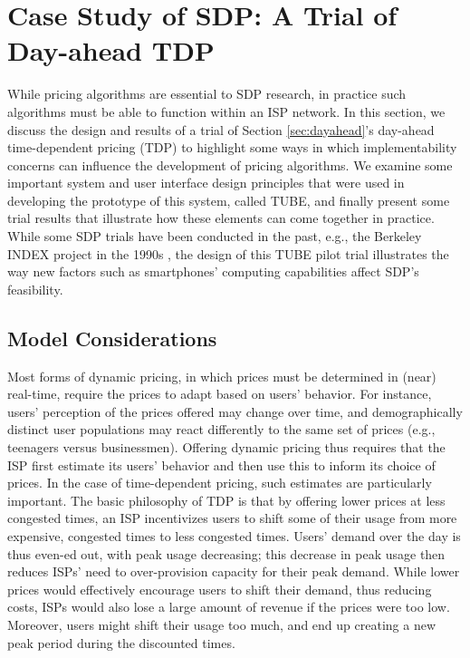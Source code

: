 \section{Case Study of SDP: A Trial of Day-ahead TDP}\label{sec:TDP}

While pricing algorithms are essential to SDP research, in practice such algorithms must be able to function within an ISP network. In this section, we discuss the design and results of a trial of Section \ref{sec:dayahead}'s day-ahead time-dependent pricing (TDP) to highlight some ways in which implementability concerns can influence the development of pricing algorithms. We examine some important system and user interface design principles that were used in developing the prototype of this system, called TUBE, and finally present some trial results that illustrate how these elements can come together in practice. While some SDP trials have been conducted in the past, e.g., the Berkeley INDEX project in the 1990s \cite{INDEX}, the design of this TUBE pilot trial illustrates the way new factors such as smartphones' computing capabilities affect SDP's feasibility.


\subsection{Model Considerations}

Most forms of dynamic pricing, in which prices must be determined in (near) real-time, require the prices to adapt based on users' behavior. For instance, users' perception of the prices offered may change over time, and demographically distinct user populations may react differently to the same set of prices (e.g., teenagers versus businessmen). Offering dynamic pricing thus requires that the ISP first estimate its users' behavior and then use this to inform its choice of prices. In the case of time-dependent pricing, such estimates are particularly important. The basic philosophy of TDP is that by offering lower prices at less congested times, an ISP incentivizes users to shift some of their usage from more expensive, congested times to less congested times. Users' demand over the day is thus even-ed out, with peak usage decreasing; this decrease in peak usage then reduces ISPs' need to over-provision capacity for their peak demand. While lower prices would effectively encourage users to shift their demand, thus reducing costs, ISPs would also lose a large amount of revenue if the prices were too low. Moreover, users might shift their usage too much, and end up creating a new peak period during the discounted times.

